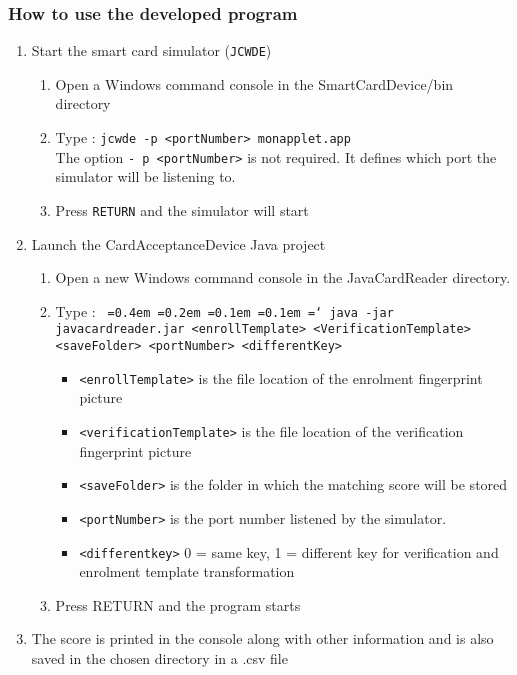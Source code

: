\documentclass[a4paper,12pt]{article}
\newcommand*\justify{%
  \fontdimen2\font=0.4em%
  \fontdimen3\font=0.2em%
  \fontdimen4\font=0.1em%
  \fontdimen7\font=0.1em%
  \hyphenchar\font=`\-%
}
\begin{document}
\subsubsection{How to use the developed program}
\begin{enumerate}
  \item Start the smart card simulator (\texttt{JCWDE})
  \begin{enumerate}
  	\item Open a Windows command console in the SmartCardDevice/bin directory
  	\item Type : \texttt{jcwde -p <portNumber> monapplet.app}\\
  	 The option \texttt{- p <portNumber>} is not required. It defines which port the simulator will be listening to.
  	\item Press \texttt{RETURN} and the simulator will start
  \end{enumerate}
  \item Launch the CardAcceptanceDevice Java project
  \begin{enumerate}
  	\item Open a new Windows command console in the JavaCardReader directory.
  	\item Type : \texttt{\justify java -jar javacardreader.jar <enrollTemplate> <VerificationTemplate> <saveFolder> <portNumber> <differentKey>}
  	\begin{itemize}
  		\item \texttt{<enrollTemplate>} is the file location of the enrolment fingerprint picture
  		\item \texttt{<verificationTemplate>} is the file location of the verification fingerprint picture
  		\item \texttt{<saveFolder>} is the folder in which the matching score will be stored
  		\item \texttt{<portNumber>} is the port number listened by the simulator.
  		\item \texttt{<differentkey>} 0 = same key, 1 = different key for verification and enrolment template transformation
  	\end{itemize}
  	\item Press RETURN and the program starts
  \end{enumerate}
  \item The score is printed in the console along with other information and is also saved in the chosen directory in a .csv file
\end{enumerate}
\end{document}
